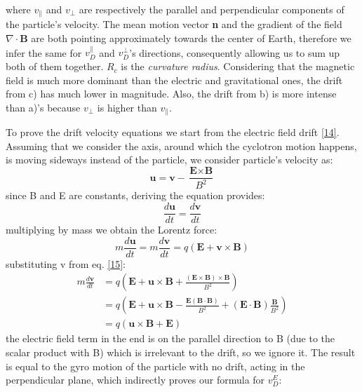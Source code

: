 \documentclass[12pt,a4paper]{article}
\begin{document}
where $v_\|$ and $v_\bot$ are respectively the parallel and perpendicular components of the particle's velocity. The mean motion vector \textbf{n} and the gradient of the field $\nabla\cdot\textbf{B}$ are both pointing approximately towards the center of Earth, therefore we infer the same for $v_D^\|$ and $v_D^\bot$'s directions, consequently allowing us to sum up both of them together. $R_c$ is the \textit{curvature radius}. Considering that the magnetic field is much more dominant than the electric and gravitational ones, the drift from c) has much lower in magnitude. Also, the drift from b) is more intense than a)'s because $v_\bot$ is higher than $v_\|$. 

To prove the drift velocity equations we start from the electric field drift \eqref{14}. Assuming that we consider the axis, around which the cyclotron motion happens, is moving sideways instead of the particle, we consider particle's velocity as:
\begin{equation}
\label{15}
    \textbf{u}=\textbf{v}-\frac{\textbf{E}\times\textbf{B}}{B^2}
\end{equation}
since B and E are constants, deriving the equation provides:
\begin{equation}
    \frac{d\textbf{u}}{dt}=\frac{d\textbf{v}}{dt}
\end{equation}
multiplying by mass we obtain the Lorentz force:
\begin{equation}
    m\frac{d\textbf{u}}{dt}=m\frac{d\textbf{v}}{dt}=q(\textbf{E}+\textbf{v}\times\textbf{B})
\end{equation}
substituting v from eq. \eqref{15}:
\begin{equation}
\begin{split}
    m\frac{d\textbf{v}}{dt}&=q(\textbf{E}+\textbf{u}\times\textbf{B}+\frac{(\textbf{E}\times\textbf{B})\times\textbf{B}}{B^2}) \\
    &=q(\textbf{E}+\textbf{u}\times\textbf{B}-\frac{\textbf{E}(\textbf{B}\cdot\textbf{B})}{B^2}+(\textbf{E}\cdot\textbf{B})\frac{\textbf{B}}{B^2}) \\
    &=q(\textbf{u}\times\textbf{B}+\textbf{E})
\end{split}   
\end{equation}
the electric field term in the end is on the parallel direction to B (due to the scalar product with B) which is irrelevant to the drift, so we ignore it. The result is equal to the gyro motion of the particle with no drift, acting in the perpendicular plane, which indirectly proves our formula for $v^E_D$:
\end{document}
